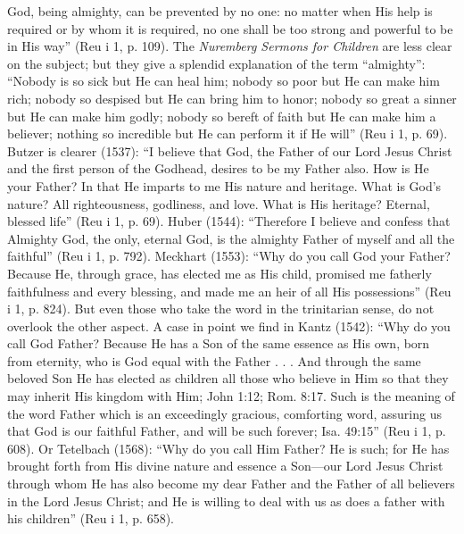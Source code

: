 God, being almighty, can be prevented by no one: no matter when His help is required or by whom it is required, no one shall be too strong and powerful to be in His way” (Reu i 1, p. 109). The \emph{Nuremberg Sermons for Children} are less clear on the subject; but they give a splendid explanation of the term “almighty”: “Nobody is so sick but He can heal him; nobody so poor but He can make him rich; nobody so despised but He can bring him to honor; nobody so great a sinner but He can make him godly; nobody so bereft of faith but He can make him a believer; nothing so incredible but He can perform it if He will” (Reu i 1, p. 69). Butzer is clearer (1537): “I believe that God, the Father of our Lord Jesus Christ and the first person of the Godhead, desires to be my Father also. How is He your Father? In that He imparts to me His nature and heritage. What is God’s nature? All righteousness, godliness, and love. What is His heritage? Eternal, blessed life” (Reu i 1, p. 69). Huber (1544): “Therefore I believe and confess that Almighty God, the only, eternal God, is the almighty Father of myself and all the faithful” (Reu i 1, p. 792). Meckhart (1553): “Why do you call God your Father? Because He, through grace, has elected me as His child, promised me fatherly faithfulness and every blessing, and made me an heir of all His possessions” (Reu i 1, p. 824). But even those who take the word in the trinitarian sense, do not overlook the other aspect. A case in point we find in Kantz (1542): “Why do you call God Father? Because He has a Son of the same essence as His own, born from eternity, who is God equal with the Father . . . And through the same beloved Son He has elected as children all those who believe in Him so that they may inherit His kingdom with Him; John 1:12; Rom. 8:17. Such is the meaning of the word Father which is an exceedingly gracious, comforting word, assuring us that God is our faithful Father, and will be such forever; Isa. 49:15” (Reu i 1, p. 608). Or Tetelbach (1568): “Why do you call Him Father? He is such; for He has brought forth from His divine nature and essence a Son—our Lord Jesus Christ through whom He has also become my dear Father and the Father of all believers in the Lord Jesus Christ; and He is willing to deal with us as does a father with his children” (Reu i 1, p. 658).

